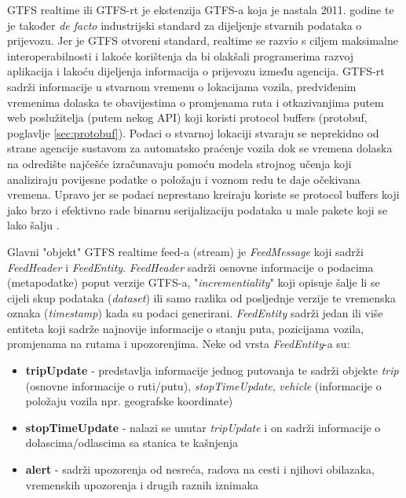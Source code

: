 \documentclass[zavrsnirad]{fer}
\begin{document}
GTFS realtime ili GTFS-rt je ekstenzija GTFS-a koja je nastala 2011. godine te je također \textit{de facto}
industrijski standard za dijeljenje stvarnih podataka o prijevozu. Jer je GTFS otvoreni standard,
realtime se razvio s ciljem maksimalne interoperabilnosti i lakoće korištenja da bi olakšali
programerima razvoj aplikacija i lakoću dijeljenja informacija o prijevozu između agencija. GTFS-rt
sadrži informacije u stvarnom vremenu o lokacijama vozila, predviđenim vremenima dolaska te
obavijestima o promjenama ruta i otkazivanjima putem web poslužitelja (putem nekog API) koji koristi protocol buffers (protobuf, poglavlje \ref{sec:protobuf}). Podaci o stvarnoj lokaciji stvaraju se neprekidno od strane agencije sustavom za automatsko praćenje vozila dok se vremena dolaska na odredište najčešće izračunavaju pomoću modela strojnog učenja koji analiziraju povijesne podatke o položaju i voznom redu te daje očekivana vremena. Upravo jer se podaci neprestano kreiraju koriste se protocol buffers koji jako brzo i efektivno rade binarnu serijalizaciju podataka u male pakete koji se lako šalju \cite{GTFS-realtime}.

Glavni "objekt" GTFS realtime feed-a (stream) je \textit{FeedMessage} koji sadrži \textit{FeedHeader} i \textit{FeedEntity}.
\textit{FeedHeader} sadrži osnovne informacije o podacima (metapodatke) poput verzije GTFS-a, "\textit{incrementiality}" koji opisuje šalje li se cijeli skup podataka (\textit{dataset}) ili samo razlika od posljednje verzije te vremenska oznaka (\textit{timestamp}) kada su podaci generirani.
\textit{FeedEntity} sadrži jedan ili više entiteta koji sadrže najnovije informacije o stanju puta, pozicijama vozila, promjenama na rutama i upozorenjima. Neke od vrsta \textit{FeedEntity}-a su: 

\begin{itemize}
	\item \textbf{tripUpdate} - predstavlja informacije jednog putovanja te sadrži objekte \textit{trip} (osnovne informacije o ruti/putu), \textit{stopTimeUpdate}, \textit{vehicle} (informacije o položaju vozila npr. geografske koordinate)
	\item \textbf{stopTimeUpdate} - nalazi se unutar \textit{tripUpdate} i on sadrži informacije o dolascima/odlascima sa stanica te kašnjenja
	\item \textbf{alert} - sadrži upozorenja od nesreća, radova na cesti i njihovi obilazaka, vremenskih upozorenja i drugih raznih iznimaka
\end{itemize}
\end{document}
